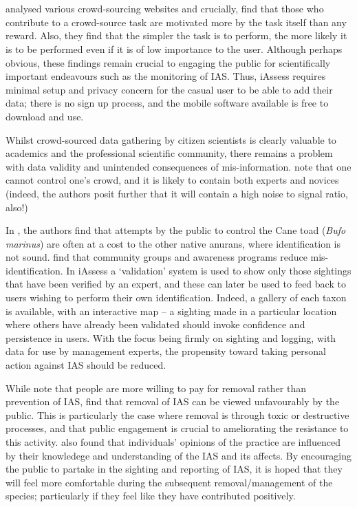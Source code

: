 \documentclass[10pt,psfig,letterpaper,twocolumn]{article}
\begin{document}
\section*{}

\citet{Wightman:2010un} analysed various crowd-sourcing websites and crucially, find that those who contribute to a crowd-source task are motivated more by the task itself than any reward.
Also, they find that the simpler the task is to perform, the more likely it is to be performed even if it is of low importance to the user.
Although perhaps obvious, these findings remain crucial to engaging the public for scientifically important endeavours such as the monitoring of IAS.
Thus, iAssess requires minimal setup and privacy concern for the casual user to be able to add their data; there is no sign up process, and the mobile software available is free to download and use.

Whilst crowd-sourced data gathering by citizen scientists is clearly valuable to academics and the professional scientific community,
there remains a problem with data validity and unintended consequences of mis-information.
\citet{Schenk:2009ud} note that one cannot control one's crowd,
and it is likely to contain both experts and novices
(indeed, the authors posit further that it will contain a high noise to signal ratio, also!)

In \citet{Somaweera:2010vi}, the authors find that attempts by the public to control the Cane toad (\emph{Bufo marinus}) are often at a cost to the other native anurans, where identification is not sound.
\citet{Somaweera:2010vi} find that community groups and awareness programs reduce mis-identification.
In iAssess a `validation' system is used to show only those sightings that have been verified by an expert, and these can later be used to feed back to users wishing to perform their own identification.
Indeed, a gallery of each taxon is available, with an interactive map -- a sighting made in a particular location where others have already been validated should invoke confidence and persistence in users.
With the focus being firmly on sighting and logging, with data for use by management experts, the propensity toward taking personal action against IAS should be reduced. 

While \citet{GarciaLlorente:vx} note that people are more willing to pay for removal rather than prevention of IAS, \citet{Sharp:2011eh} find that removal of IAS can be viewed unfavourably by the public.
This is particularly the case where removal is through toxic or destructive processes, and that public engagement is crucial to ameliorating the resistance to this activity.
\citet{GarciaLlorente:vx} also found that individuals' opinions of the practice are influenced by their knowledege and understanding of the IAS and its affects.
By encouraging the public to partake in the sighting and reporting of IAS, it is hoped that they will feel more comfortable during the subsequent removal/management of the species;
particularly if they feel like they have contributed positively. 
\end{document}
